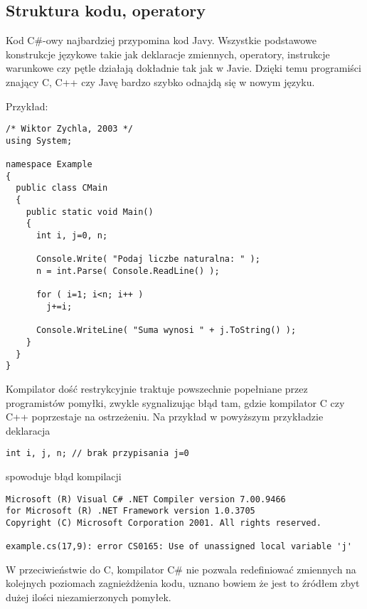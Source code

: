 ﻿\subsection{Struktura kodu, operatory}

Kod C\#-owy najbardziej przypomina kod Javy. Wszystkie podstawowe konstrukcje językowe takie jak
deklaracje zmiennych, operatory, instrukcje warunkowe czy pętle działają dokładnie tak jak w Javie.
Dzięki temu programiści znający C, C++ czy Javę bardzo szybko odnajdą się w nowym języku.

Przykład:

\begin{scriptsize}
\begin{verbatim}
/* Wiktor Zychla, 2003 */
using System;

namespace Example
{
  public class CMain
  {
    public static void Main()
    {
      int i, j=0, n;

      Console.Write( "Podaj liczbe naturalna: " );
      n = int.Parse( Console.ReadLine() );

      for ( i=1; i<n; i++ )
        j+=i;   

      Console.WriteLine( "Suma wynosi " + j.ToString() );
    }
  }
}
\end{verbatim}
\end{scriptsize}

Kompilator dość restrykcyjnie traktuje powszechnie popełniane przez programistów pomyłki, zwykle
sygnalizując błąd tam, gdzie kompilator C czy C++ poprzestaje na ostrzeżeniu. Na przykład w powyższym
przykładzie deklaracja

\begin{scriptsize}
\begin{verbatim}
int i, j, n; // brak przypisania j=0
\end{verbatim}
\end{scriptsize}

spowoduje błąd kompilacji

\begin{scriptsize}
\begin{verbatim}
Microsoft (R) Visual C# .NET Compiler version 7.00.9466
for Microsoft (R) .NET Framework version 1.0.3705
Copyright (C) Microsoft Corporation 2001. All rights reserved.

example.cs(17,9): error CS0165: Use of unassigned local variable 'j'
\end{verbatim}
\end{scriptsize}

W przeciwieństwie do C, kompilator C\# nie pozwala redefiniować zmiennych na kolejnych poziomach
zagnieżdżenia kodu, uznano bowiem że jest to źródłem zbyt dużej ilości niezamierzonych pomyłek.

